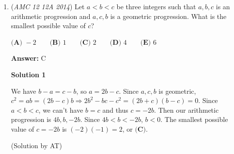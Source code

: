 \begin{enumerate}
 In total, there are $120+1200+900=2220$ assignments, or $\boxed{\textbf{(B)}}$.

 (Solution by AwesomeToad16)

 



\textbf{Solution 2}

We can work in reverse by first determining the number of combinations in which there are more than $2$ friends in at least one room. There are three cases:

 \textbf{Case 1:} Three friends are in one room. Since there are $5$ possible rooms in which this can occur, we are choosing three friends from the five, and the other two friends can each be in any of the four remaining rooms,there are $5\cdot\binom{5}{3}\cdot4\cdot4 = 800$ possibilities.

 \textbf{Case 2:} Four friends are in one room. Again, there are $5$ possible rooms, we are choosing four of the five friends, and the other one can be in any of the other four rooms, so there are $5\cdot\binom{5}{4}\cdot4= 100$ possibilities.

 \textbf{Case 3:} Five friends are in one room. There are $5$ possible rooms in which this can occur, so there are $5$ possibilities.

 Since there are $5^5 = 3125$ possible combinations of the friends, the number fitting the given criteria is $3125 - (800+100+5) = \boxed{2220}$.

 


	\item (\textit{AMC 12 12A 2014}) Let $a<b<c$ be three integers such that $a,b,c$ is an arithmetic progression and $a,c,b$ is a geometric progression.  What is the smallest possible value of $c$?


 $\textbf{(A) }-2\qquad \textbf{(B) }1\qquad \textbf{(C) }2\qquad \textbf{(D) }4\qquad \textbf{(E) }6\qquad$

 \textbf{Answer: }C



\textbf{Solution 1}

We have $b-a=c-b$, so $a=2b-c$. Since $a,c,b$ is geometric, $c^2=ab=(2b-c)b \Rightarrow 2b^2-bc-c^2=(2b+c)(b-c)=0$. Since $a<b<c$, we can't have $b=c$ and thus $c=-2b$. Then our arithmetic progression is $4b,b,-2b$. Since $4b < b < -2b$, $b < 0$. The smallest possible value of $c=-2b$ is $(-2)(-1)=2$, or $\boxed{\textbf{(C)}}$.

 (Solution by AT)

 




\end{enumerate}
